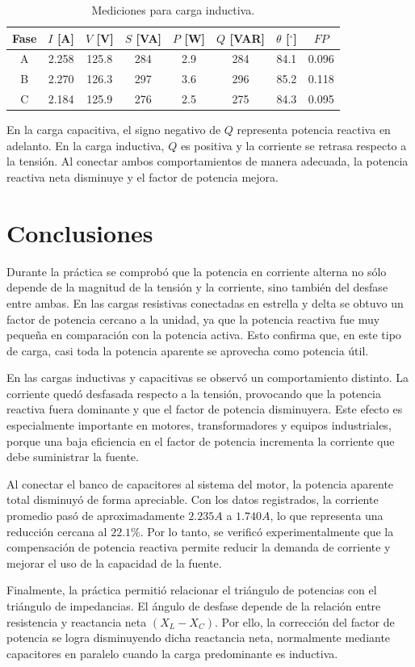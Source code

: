 	\begin{table}[H]
		\centering
		\caption{Mediciones para carga inductiva.}
		\label{tab:carga_inductiva}
			\begin{tabular}{c c c c c c c c}
				\toprule
				Fase & \(I\) [A] & \(V\) [V] & \(S\) [VA] & \(P\) [W] & \(Q\) [VAR] & \(\theta\) [\(^\circ\)] & \(FP\) \\
				\midrule
				A & 2.258 & 125.8 & 284 & 2.9 & 284 & 84.1 & 0.096 \\
				B & 2.270 & 126.3 & 297 & 3.6 & 296 & 85.2 & 0.118 \\
				C & 2.184 & 125.9 & 276 & 2.5 & 275 & 84.3 & 0.095 \\
				\bottomrule
		\end{tabular}
	\end{table}
	
	En la carga capacitiva, el signo negativo de \(Q\) representa potencia reactiva en adelanto. En la carga inductiva, \(Q\) es positiva y la corriente se retrasa respecto a la tensión. Al conectar ambos comportamientos de manera adecuada, la potencia reactiva neta disminuye y el factor de potencia mejora.
	
	\section*{Conclusiones}
	
	Durante la práctica se comprobó que la potencia en corriente alterna no sólo depende de la magnitud de la tensión y la corriente, sino también del desfase entre ambas. En las cargas resistivas conectadas en estrella y delta se obtuvo un factor de potencia cercano a la unidad, ya que la potencia reactiva fue muy pequeña en comparación con la potencia activa. Esto confirma que, en este tipo de carga, casi toda la potencia aparente se aprovecha como potencia útil.
	
	En las cargas inductivas y capacitivas se observó un comportamiento distinto. La corriente quedó desfasada respecto a la tensión, provocando que la potencia reactiva fuera dominante y que el factor de potencia disminuyera. Este efecto es especialmente importante en motores, transformadores y equipos industriales, porque una baja eficiencia en el factor de potencia incrementa la corriente que debe suministrar la fuente.
	
	Al conectar el banco de capacitores al sistema del motor, la potencia aparente total disminuyó de forma apreciable. Con los datos registrados, la corriente promedio pasó de aproximadamente \(2.235\unit{A}\) a \(1.740\unit{A}\), lo que representa una reducción cercana al \(22.1\%\). Por lo tanto, se verificó experimentalmente que la compensación de potencia reactiva permite reducir la demanda de corriente y mejorar el uso de la capacidad de la fuente.
	
	Finalmente, la práctica permitió relacionar el triángulo de potencias con el triángulo de impedancias. El ángulo de desfase depende de la relación entre resistencia y reactancia neta \((X_L-X_C)\). Por ello, la corrección del factor de potencia se logra disminuyendo dicha reactancia neta, normalmente mediante capacitores en paralelo cuando la carga predominante es inductiva.